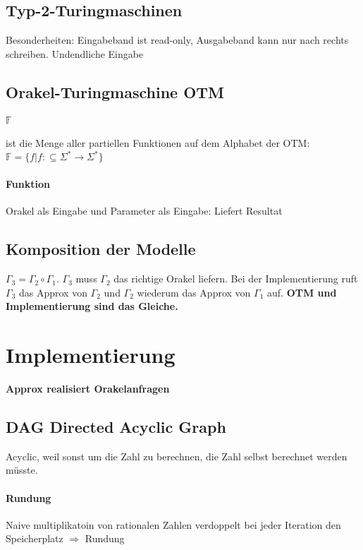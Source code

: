 \documentclass[ngerman]{scrartcl}
\begin{document}
\subsection{Typ-2-Turingmaschinen}
Besonderheiten: Eingabeband ist read-only, Ausgabeband kann nur nach rechts schreiben. Undendliche Eingabe 


\subsection{Orakel-Turingmaschine OTM}
\paragraph{$ \mathbb{F} $} 
ist die Menge aller partiellen Funktionen auf dem Alphabet der OTM: \\ 
 $ \mathbb{F} = \{ f | f: \subseteq \Sigma^* \rightarrow  \Sigma^* \}$
\paragraph{Funktion} Orakel als Eingabe und Parameter als Eingabe: Liefert Resultat

\subsection{Komposition der Modelle}
$ \Gamma_3 = \Gamma_2 \circ \Gamma_1 $. $ \Gamma_3 $ muss $ \Gamma_2 $ das richtige Orakel liefern. Bei der Implementierung ruft $ \Gamma_3 $ das Approx von $ \Gamma_2 $ und $ \Gamma_2 $ wiederum das Approx von $ \Gamma_1 $ auf. \textbf{OTM und Implementierung sind das Gleiche.}

\section{Implementierung}
\textbf{Approx realisiert Orakelanfragen}


\subsection{DAG Directed Acyclic Graph}
Acyclic, weil sonst um die Zahl zu berechnen, die Zahl selbst berechnet werden müsste.

\paragraph{Rundung} Naive multiplikatoin von rationalen Zahlen verdoppelt bei jeder Iteration den Speicherplatz $ \Rightarrow $ Rundung 
\end{document}
